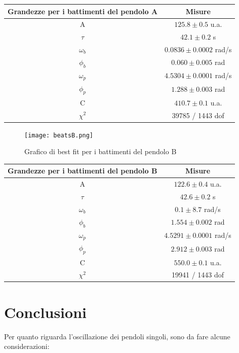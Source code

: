 \documentclass{article}
\begin{document}
\begin{center}
\begin{tabular}{cc}
    \toprule
    Grandezze per i battimenti del pendolo A & Misure \\
     \midrule
    A & $125.8 \pm 0.5$ u.a.\\
    $\tau$ & $42.1 \pm 0.2$ s\\
    $\omega_b$ & $0.0836 \pm 0.0002$ rad/s\\
    $\phi_b$ & $0.060 \pm 0.005$ rad\\
    $\omega_p$ & $4.5304 \pm 0.0001$ rad/s\\
    $\phi_p$ & $1.288 \pm 0.003$ rad\\
    C & $410.7 \pm 0.1$ u.a.\\
    $\chi^2$ & 39785 / 1443 dof\\
    \bottomrule
\end{tabular}
\end{center}

\begin{figure}[H]
    \centering
    \texttt{[image: beatsB.png]}
    \caption{Grafico di best fit per i battimenti del pendolo B}
    \label{fig:my_label}
\end{figure}

\begin{center}
\begin{tabular}{cc}
    \toprule
    Grandezze per i battimenti del pendolo B & Misure \\
     \midrule
    A & $122.6 \pm 0.4$ u.a.\\
    $\tau$ & $42.6 \pm 0.2$ s\\
    $\omega_b$ & $0.1 \pm 8.7$ rad/s\\
    $\phi_b$ & $1.554 \pm 0.002$ rad\\
    $\omega_p$ & $4.5291 \pm 0.0001$ rad/s\\
    $\phi_p$ & $2.912 \pm 0.003$ rad\\
    C & $550.0 \pm 0.1$ u.a.\\
    $\chi^2$ & 19941 / 1443 dof\\
    \bottomrule
\end{tabular}
\end{center}

\vspace{2em}

\section{Conclusioni}
Per quanto riguarda l'oscillazione dei pendoli singoli, sono da fare alcune considerazioni:
\end{document}
